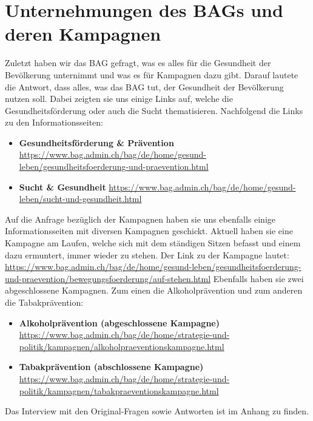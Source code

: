 \section{Unternehmungen des BAGs und deren Kampagnen}
Zuletzt haben wir das BAG gefragt, was es alles für die Gesundheit der Bevölkerung unternimmt und was es für Kampagnen dazu gibt. Darauf lautete die Antwort, dass alles, was das BAG tut, der Gesundheit der Bevölkerung nutzen soll. Dabei zeigten sie uns einige Links auf, welche die Gesundheitsförderung oder auch die Sucht thematisieren. Nachfolgend die Links zu den Informationsseiten: 
\begin{itemize}
  \item \textbf{Gesundheitsförderung \& Prävention}
  \newline
  \url{https://www.bag.admin.ch/bag/de/home/gesund-leben/gesundheitsfoerderung-und-praevention.html}
  \item \textbf{Sucht \& Gesundheit}
  \newline
  \url{https://www.bag.admin.ch/bag/de/home/gesund-leben/sucht-und-gesundheit.html}
\end{itemize}
Auf die Anfrage bezüglich der Kampagnen haben sie uns ebenfalls einige Informationsseiten mit diversen Kampagnen geschickt. Aktuell haben sie eine Kampagne am Laufen, welche sich mit dem ständigen Sitzen befasst und einem dazu ermuntert, immer wieder zu stehen. Der Link zu der Kampagne lautet:
\newline
\url{https://www.bag.admin.ch/bag/de/home/gesund-leben/gesundheitsfoerderung-und-praevention/bewegungsfoerderung/auf-stehen.html}
\newline
Ebenfalls haben sie zwei abgeschlossene Kampagnen. Zum einen die Alkoholprävention und zum anderen die Tabakprävention:
\begin{itemize}
  \item \textbf{Alkoholprävention (abgeschlossene Kampagne)}
  \newline
  \url{https://www.bag.admin.ch/bag/de/home/strategie-und-politik/kampagnen/alkoholpraeventionskampagne.html}
  \item \textbf{Tabakprävention (abschlossene Kampagne)}
  \newline
  \url{https://www.bag.admin.ch/bag/de/home/strategie-und-politik/kampagnen/tabakpraeventionskampagne.html}
\end{itemize}
Das Interview mit den Original-Fragen sowie Antworten ist im Anhang zu finden.